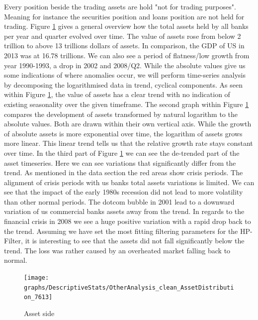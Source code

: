 \documentclass[12pt, a4paper]{article} %
\begin{document}
 Every position beside the trading assets are hold "not for trading purposes". Meaning for instance the securities position and loans position are not held for trading. 
 Figure \ref{fig:assets} gives a general overview how the total assets held by all banks per year and quarter evolved over time. The value of assets rose from below 2 trillion to above 13 trillions dollars of assets. In comparison, the GDP of US in 2013 was at 16.78 trillions. We can also see a period of flatness/low growth from  year 1990-1993, a drop in 2002 and 2008/Q2. While the absolute values give us some indications of where anomalies occur, we will perform time-series analysis by decomposing the logarithmised data in trend, cyclical components. As seen within Figure \ref{fig:assets}, the value of assets has a clear trend with no indication of existing seasonality over the given timeframe. The second graph within Figure \ref{fig:assets} compares the development of assets transformed by natural logarithm to the absolute values. Both are drawn within their own vertical axis. While the growth of absolute assets is more exponential over time, the logarithm of assets grows more linear. This linear trend tells us that the relative growth rate stays constant over time. In the third part of Figure \ref{fig:assets} we can see the de-trended part of the asset timeseries. Here we can see variations that significantly differ from the trend. As mentioned in the data section the red areas show crisis periods. The alignment of crisis periods with us banks total assets variations is limited. We can see that the impact of the early 1980s recession did not lead to more volatility than other normal periods. The dotcom bubble in 2001 lead to a downward variation of us commercial banks assets away from the trend. In regards to the financial crisis in 2008 we see a huge positive variation with a rapid drop back to the trend. Assuming we have set the most fitting filtering parameters for the HP-Filter, it is interesting to see that the assets did not fall significantly below the trend. The loss was rather caused by an overheated market falling back to normal.
 
  
\begin{figure}[hbtp]
\centering
\caption{Asset side}
\texttt{[image: graphs/DescriptiveStats/OtherAnalysis\_clean\_AssetDistribution\_7613]}
\label{fig:assets}
\end{figure}
\end{document}
